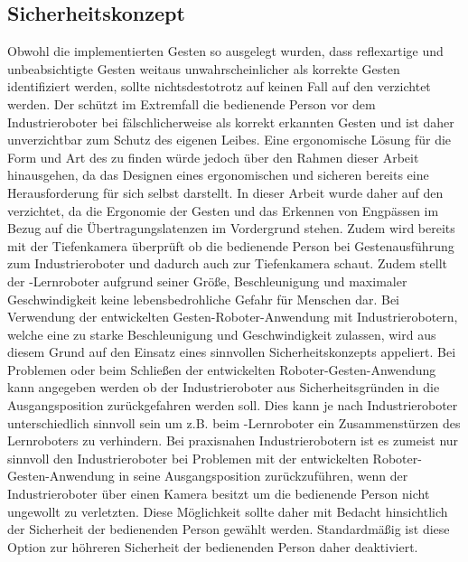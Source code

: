 \subsection{Sicherheitskonzept} %
Obwohl die implementierten Gesten so ausgelegt wurden, dass reflexartige und unbeabsichtigte Gesten weitaus unwahrscheinlicher als korrekte Gesten identifiziert werden, sollte nichtsdestotrotz auf keinen Fall auf den  verzichtet werden. Der  schützt im Extremfall die bedienende Person vor dem Industrieroboter bei fälschlicherweise als korrekt erkannten Gesten und ist daher unverzichtbar zum Schutz des eigenen Leibes. Eine ergonomische Lösung für die Form und Art des  zu finden würde jedoch über den Rahmen dieser Arbeit hinausgehen, da das Designen eines ergonomischen und sicheren  bereits eine Herausforderung für sich selbst darstellt. In dieser Arbeit wurde daher auf den  verzichtet, da die Ergonomie der Gesten und das Erkennen von Engpässen im Bezug auf die Übertragungslatenzen im Vordergrund stehen. Zudem wird bereits mit der Tiefenkamera überprüft ob die bedienende Person bei Gestenausführung zum Industrieroboter und dadurch auch zur Tiefenkamera schaut. Zudem stellt der -Lernroboter aufgrund seiner Größe, Beschleunigung und maximaler Geschwindigkeit keine lebensbedrohliche Gefahr für Menschen dar. Bei Verwendung der entwickelten Gesten-Roboter-Anwendung mit Industrierobotern, welche eine zu starke Beschleunigung und Geschwindigkeit zulassen, wird aus diesem Grund auf den Einsatz eines sinnvollen Sicherheitskonzepts appeliert. Bei Problemen oder beim Schließen der entwickelten Roboter-Gesten-Anwendung kann angegeben werden ob der Industrieroboter aus Sicherheitsgründen in die Ausgangsposition zurückgefahren werden soll. Dies kann je nach Industrieroboter unterschiedlich sinnvoll sein um z.B. beim -Lernroboter ein Zusammenstürzen des Lernroboters zu verhindern. Bei praxisnahen Industrierobotern ist es zumeist nur sinnvoll den Industrieroboter bei Problemen mit der entwickelten Roboter-Gesten-Anwendung in seine Ausgangsposition zurückzuführen, wenn der Industrieroboter über einen Kamera besitzt um die bedienende Person nicht ungewollt zu verletzten. Diese Möglichkeit sollte daher mit Bedacht hinsichtlich der Sicherheit der bedienenden Person gewählt werden. Standardmäßig ist diese Option zur höhreren Sicherheit der bedienenden Person daher deaktiviert.

